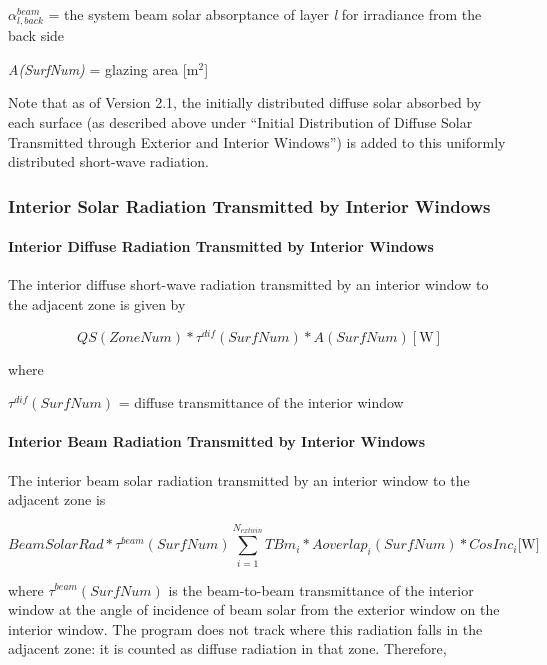 \(\alpha_{l,back}^{beam}\) = the system beam solar absorptance of layer \emph{l} for irradiance from the back side

\emph{A(SurfNum)} = glazing area {[}m\(^{2}\){]}

Note that as of Version 2.1, the initially distributed diffuse solar absorbed by each surface (as described above under ``Initial Distribution of Diffuse Solar Transmitted through Exterior and Interior Windows'') is added to this uniformly distributed short-wave radiation.

\subsubsection{Interior Solar Radiation Transmitted by Interior Windows}\label{interior-solar-radiation-transmitted-by-interior-windows}

\paragraph{Interior Diffuse Radiation Transmitted by Interior Windows}\label{interior-diffuse-radiation-transmitted-by-interior-windows}

The interior diffuse short-wave radiation transmitted by an interior window to the adjacent zone is given by

\begin{equation}
QS(ZoneNum)*{\tau ^{dif}}(SurfNum)*A(SurfNum){\mathrm{    [W]}}
\end{equation}

where

\({\tau ^{dif}}(SurfNum)\) = diffuse transmittance of the interior window

\paragraph{Interior Beam Radiation Transmitted by Interior Windows}\label{interior-beam-radiation-transmitted-by-interior-windows}

The interior beam solar radiation transmitted by an interior window to the adjacent zone is

\begin{equation}
BeamSolarRad*{\tau ^{beam}}(SurfNum)\sum\limits_{i = 1}^{{N_{extwin}}} {TB{m_i}*Aoverla{p_i}(SurfNum)*CosIn{c_i}{\mathrm{    [W}}]}
\end{equation}

where \({\tau ^{beam}}(SurfNum)\) is the beam-to-beam transmittance of the interior window at the angle of incidence of beam solar from the exterior window on the interior window. The program does not track where this radiation falls in the adjacent zone: it is counted as diffuse radiation in that zone. Therefore,

